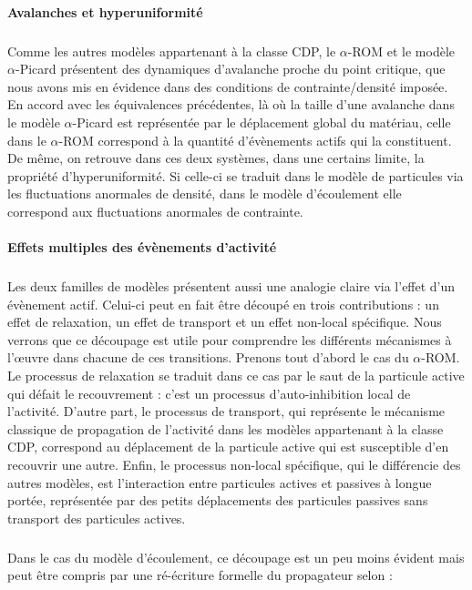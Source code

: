 \paragraph{Avalanches et hyperuniformité}

\subparagraph{}Comme les autres modèles appartenant à la classe CDP, le $\alpha$-ROM et le modèle $\alpha$-Picard présentent des dynamiques d'avalanche proche du point critique, que nous avons mis en évidence dans des conditions de contrainte/densité imposée. En accord avec les équivalences précédentes, là où la taille d'une avalanche dans le modèle $\alpha$-Picard est représentée par le déplacement global du matériau, celle dans le $\alpha$-ROM correspond à la quantité d'évènements actifs qui la constituent. De même, on retrouve dans ces deux systèmes, dans une certains limite, la propriété d'hyperuniformité. Si celle-ci se traduit dans le modèle de particules via les fluctuations anormales de densité, dans le modèle d'écoulement elle correspond aux fluctuations anormales de contrainte.

\paragraph{Effets multiples des évènements d'activité}

\subparagraph{}Les deux familles de modèles présentent aussi une analogie claire via l'effet d'un évènement actif. Celui-ci peut en fait être découpé en trois contributions : un effet de relaxation, un effet de transport et un effet non-local spécifique. Nous verrons que ce découpage est utile pour comprendre les différents mécanismes à l’œuvre dans chacune de ces transitions. Prenons tout d'abord le cas du $\alpha$-ROM. Le processus de relaxation se traduit dans ce cas par le saut de la particule active qui défait le recouvrement : c'est un processus d'auto-inhibition local de l'activité. D'autre part, le processus de transport, qui représente le mécanisme classique de propagation de l'activité dans les modèles appartenant à la classe CDP, correspond au déplacement de la particule active qui est susceptible d'en recouvrir une autre. Enfin, le processus non-local spécifique, qui le différencie des autres modèles, est l'interaction entre particules actives et passives à longue portée, représentée par des petits déplacements des particules passives sans transport des particules actives. 

\subparagraph{}Dans le cas du modèle d'écoulement, ce découpage est un peu moins évident mais peut être compris par une ré-écriture formelle du propagateur selon :


